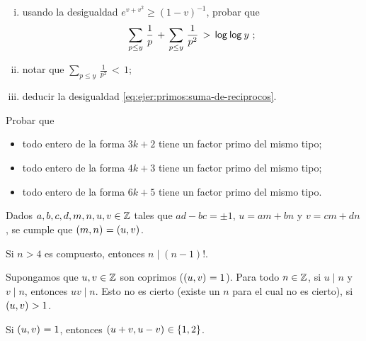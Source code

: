 \begin{ejerPrimos}
\begin{enumerate}[(i)]
		\item\label{item:ejer:primos:suma-de-reciprocos:v}
			usando la desigualdad $e^{v+v^2}\geq (1-v)^{-1}$,
			probar que
			\begin{displaymath}
				\sum_{p\leq y}\,\frac 1{p}\,+\,
					\sum_{p\leq y}\,\frac 1{p^2}\,>\,
					\mathsf{log}_{}\,\mathsf{log}_{}\,y
				\text{ ;}
			\end{displaymath}
		\item\label{item:ejer:primos:suma-de-reciprocos:vi}
			notar que $\sum_{p\leq y}\,\frac 1{p^2}\,<\,1$;%
		\item\label{item:ejer:primos:suma-de-reciprocos:vii}
			deducir la desigualdad
			\eqref{eq:ejer:primos:suma-de-reciprocos}.
	\end{enumerate}
\end{ejerPrimos}

\begin{ejerPrimos}
	Probar que
	\begin{itemize}
		\item todo entero de la forma $3k+2$ tiene un factor primo
			del mismo tipo;
		\item todo entero de la forma $4k+3$ tiene un factor primo
			del mismo tipo;
		\item todo entero de la forma $6k+5$ tiene un factor primo
			del mismo tipo.
	\end{itemize}
\end{ejerPrimos}

\begin{ejerPrimos}
	Dados $a,b,c,d,m,n,u,v\in\mathbb{Z}$ tales que
	$ad-bc=\pm1$, $u=am+bn$ y $v=cm+dn$, se cumple que
	$\left({m,n}\right)_{}=\left({u,v}\right)_{}$.
\end{ejerPrimos}

\begin{ejerPrimos}
	Si $n>4$ es compuesto, entonces $n\mid (n-1)!$.
\end{ejerPrimos}

\begin{ejerPrimos}
	Supongamos que $u,v\in\mathbb{Z}$ son coprimos ($\left({u,v}\right)_{}=1$).
	Para todo $n\in\mathbb{Z}$, si $u\mid n$ y $v\mid n$, entonces
	$uv\mid n$. Esto no es cierto (existe un $n$ para el cual no es
	cierto), si $\left({u,v}\right)_{}>1$.
\end{ejerPrimos}

\begin{ejerPrimos}
	Si $\left({u,v}\right)_{}=1$, entonces $\left({u+v,u-v}\right)_{}\in\{1,2\}$.
\end{ejerPrimos}

